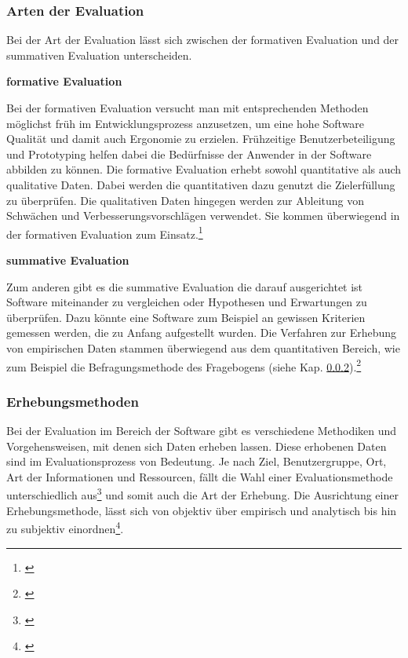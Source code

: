\subsubsection{Arten der Evaluation}
Bei der Art der Evaluation lässt sich zwischen der formativen Evaluation und der summativen Evaluation unterscheiden.

\textbf{formative Evaluation}

Bei der formativen Evaluation versucht man mit entsprechenden Methoden möglichst früh im Entwicklungsprozess anzusetzen, um eine hohe Software Qualität und damit auch Ergonomie zu erzielen. Frühzeitige Benutzerbeteiligung und Prototyping helfen dabei die Bedürfnisse der Anwender in der Software abbilden zu können. Die formative Evaluation erhebt sowohl quantitative als auch qualitative Daten. Dabei werden die quantitativen dazu genutzt die Zielerfüllung zu überprüfen. Die qualitativen Daten hingegen werden zur Ableitung von Schwächen und Verbesserungsvorschlägen verwendet. Sie kommen überwiegend in der formativen Evaluation zum Einsatz.\footnote{\cite[vgl.][7]{Hegner2003}}

\textbf{summative Evaluation}

Zum anderen gibt es die summative Evaluation die darauf ausgerichtet ist Software miteinander zu vergleichen oder Hypothesen und Erwartungen zu überprüfen. Dazu könnte eine Software zum Beispiel an gewissen Kriterien gemessen werden, die zu Anfang aufgestellt wurden. Die Verfahren zur Erhebung von empirischen Daten stammen überwiegend aus dem quantitativen Bereich, wie zum Beispiel die Befragungsmethode des Fragebogens (siehe Kap. \ref{sec:erhebungsmethoden}).\footnote{\cite[vgl.][8]{Hegner2003}}


\subsubsection{Erhebungsmethoden}
\label{sec:erhebungsmethoden}
Bei der Evaluation im Bereich der Software gibt es verschiedene Methodiken und Vorgehensweisen, mit denen sich Daten erheben lassen. Diese erhobenen Daten sind im Evaluationsprozess von Bedeutung. Je nach Ziel, Benutzergruppe, Ort, Art der Informationen und Ressourcen, fällt die Wahl einer Evaluationsmethode unterschiedlich aus\footnote{\cite[vgl.][10]{Hegner2003}} und somit auch die Art der Erhebung. Die Ausrichtung einer Erhebungsmethode, lässt sich von objektiv über empirisch und analytisch bis hin zu subjektiv einordnen\footnote{\cite[vgl.][15]{Hegner2003}}.

